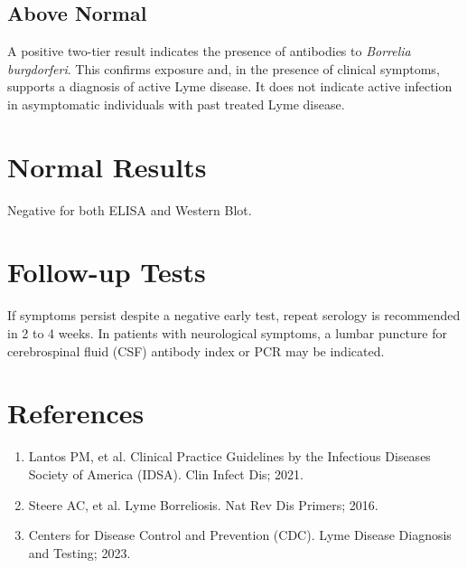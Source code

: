 \subsection*{Above Normal}
A positive two-tier result indicates the presence of antibodies to \textit{Borrelia burgdorferi}. This confirms exposure and, in the presence of clinical symptoms, supports a diagnosis of active Lyme disease. It does not indicate active infection in asymptomatic individuals with past treated Lyme disease.

\section*{Normal Results}
Negative for both ELISA and Western Blot.

\section*{Follow-up Tests}
If symptoms persist despite a negative early test, repeat serology is recommended in 2 to 4 weeks. In patients with neurological symptoms, a lumbar puncture for cerebrospinal fluid (CSF) antibody index or PCR may be indicated.

\section*{References}
\begin{enumerate}
  \item Lantos PM, et al. Clinical Practice Guidelines by the Infectious Diseases Society of America (IDSA). Clin Infect Dis; 2021.
  \item Steere AC, et al. Lyme Borreliosis. Nat Rev Dis Primers; 2016.
  \item Centers for Disease Control and Prevention (CDC). Lyme Disease Diagnosis and Testing; 2023.
\end{enumerate}

\clearpage
